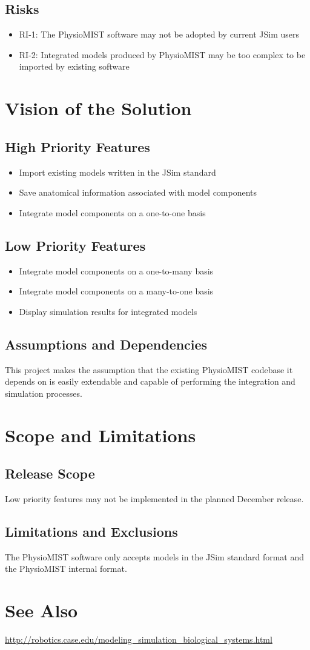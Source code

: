 \documentclass{article}
\begin{document}
\subsection{Risks}
\begin{itemize}
\item RI-1: The PhysioMIST software may not be adopted by current JSim users
\item RI-2: Integrated models produced by PhysioMIST may be too complex to be imported by existing software
\end{itemize}

\section{Vision of the Solution}
\subsection{High Priority Features}
\begin{itemize}
\item Import existing models written in the JSim standard
\item Save anatomical information associated with model components
\item Integrate model components on a one-to-one basis
\end{itemize}
\subsection{Low Priority Features}
\begin{itemize}
\item Integrate model components on a one-to-many basis
\item Integrate model components on a many-to-one basis
\item Display simulation results for integrated models
\end{itemize}
\subsection{Assumptions and Dependencies}
This project makes the assumption that the existing PhysioMIST codebase it depends on is easily extendable and capable of performing the integration and simulation processes.

\section{Scope and Limitations}
\subsection{Release Scope}
Low priority features may not be implemented in the planned December release.
\subsection{Limitations and Exclusions}
The PhysioMIST software only accepts models in the JSim standard format and the PhysioMIST internal format.

\section{See Also}
\url{http://robotics.case.edu/modeling_simulation_biological_systems.html}
\end{document}
